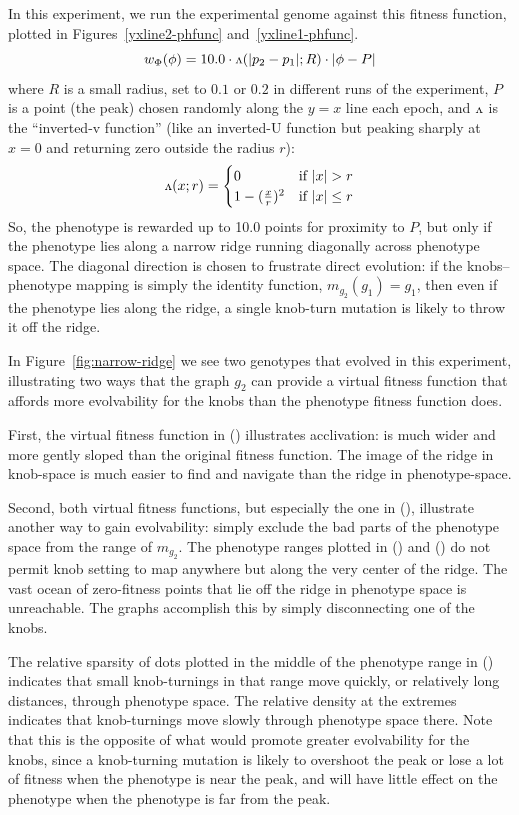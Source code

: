 \documentclass[letterpaper]{article}
\newcommand{\invv}{\ensuremath{\rotatebox[origin=c]{180}{\textrm{v}}}\xspace}
\begin{document}
In this experiment, we run the experimental genome against this fitness
function, plotted in Figures~\ref{yxline2-phfunc} and~\ref{yxline1-phfunc}.
\[
   w_\Phi(\phi) = 10.0 \cdot \invv(|p_2 - p_1|; R) \cdot |\phi - P|
\]
where
$R$ is a small radius, set to $0.1$ or $0.2$ in different runs of the
experiment,
$P$ is a point (the peak) chosen randomly along the $y=x$ line each epoch,
and \invv is the ``inverted-v function'' (like an inverted-U function but
peaking sharply at $x=0$ and returning zero outside the radius $r$):
\[
   \invv(x; r) =
   \begin{cases}
      0 & \text{if } |x|>r \\
      1 - (\frac{x}{r})^2 &
      \text{if } |x|\leq r
   \end{cases}
\]
So, the phenotype is rewarded up to 10.0 points for proximity to $P$, but only
if the phenotype lies along a narrow ridge running diagonally across phenotype
space. The diagonal direction is chosen to frustrate direct evolution: if the
knobs–phenotype mapping is simply the identity function, $m_{g_2}(g_1)=g_1$,
then even if the phenotype lies along the ridge, a single knob-turn mutation
is likely to throw it off the ridge.

In Figure~\ref{fig:narrow-ridge} we see two genotypes that evolved in this
experiment, illustrating two ways that the graph $g_2$ can provide a virtual
fitness function that affords more evolvability for the knobs than the
phenotype fitness function does.

First, the virtual fitness function in () illustrates
acclivation: is much wider and more gently sloped than the original fitness
function. The image of the ridge in knob-space is much easier to find and
navigate than the ridge in phenotype-space.

Second, both virtual fitness functions, but especially the one in
(), illustrate another way to gain evolvability:
simply exclude the bad parts of the phenotype space from the range of
$m_{g_2}$. The phenotype ranges plotted in ()
and ()
do not permit  knob setting to map anywhere but along the very
center of the ridge. The vast ocean of zero-fitness points that lie off the
ridge in phenotype space is unreachable. The graphs accomplish this by simply
disconnecting one of the knobs.

The relative sparsity of dots plotted in the middle of the phenotype range
in () indicates that small knob-turnings in that range
move quickly, or relatively long distances, through phenotype space. The
relative density at the extremes indicates that knob-turnings move slowly
through phenotype space there. Note that this is the opposite of what would
promote greater evolvability for the knobs, since a knob-turning mutation is
likely to overshoot the peak or lose a lot of fitness when the phenotype is
near the peak, and will have little effect on the phenotype when the phenotype
is far from the peak.
\end{document}
